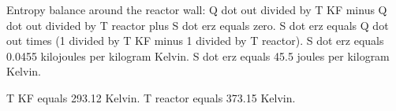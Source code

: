 Entropy balance around the reactor wall:  
Q dot out divided by T KF minus Q dot out divided by T reactor plus S dot erz equals zero.  
S dot erz equals Q dot out times (1 divided by T KF minus 1 divided by T reactor).  
S dot erz equals 0.0455 kilojoules per kilogram Kelvin.  
S dot erz equals 45.5 joules per kilogram Kelvin.  

T KF equals 293.12 Kelvin.  
T reactor equals 373.15 Kelvin.